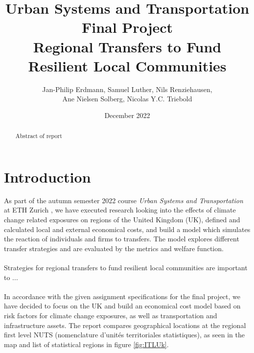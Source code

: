 \documentclass[10pt,a4paper]{article}
\title{\vspace{.0cm}Urban Systems and Transportation \\ Final Project \vspace{5.5cm}\\ \textbf{Regional Transfers to Fund Resilient Local Communities}\vspace{3.5 cm}}
\author{Jan-Philip Erdmann, Samuel Luther, Nils Renziehausen, \\Ane Nielsen Solberg, Nicolas Y.C. Triebold\vspace{1cm}}
\date{December 2022}
\begin{document}
\maketitle
\newpage
{}


\begin{abstract}
Abstract of report
\end{abstract}
\newpage
\section{Introduction}
As part of the autumn semester 2022 course \textit{Urban Systems and Transportation} at ETH Zurich \cite{course}, we have executed research looking into the effects of climate change related exposures on regions of the United Kingdom (UK), defined and calculated local and external economical costs, and build a model which simulates the reaction of individuals and firms to transfers. The model explores different transfer strategies and are evaluated by the metrics and welfare function. \\\\
Strategies for regional transfers to fund resilient local communities are important to ...
\\\\
In accordance with the given assignment specifications for the final project, we have decided to focus on the UK and build an economical cost model based on risk factors for climate change exposures, as well as transportation and infrastructure assets. The report compares geographical locations at the regional first level NUTS (nomenclature d'unités territoriales statistiques)\cite{2022firstlevel,noauthor_international_2022}, as seen in the map and list of statistical regions in figure \ref{fig:ITLUk}.\\
\end{document}
